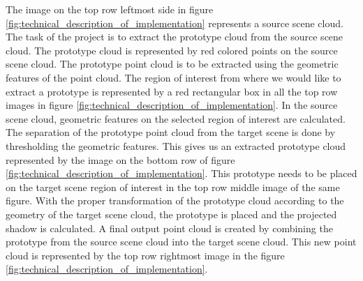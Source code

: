 The image on the top row leftmost side in figure \ref{fig:technical_description_of_implementation} represents a source scene cloud. The task of the project is to extract the prototype cloud from the source scene cloud. The prototype cloud is represented by red colored points on the source scene cloud. The prototype point cloud is to be extracted using the geometric features of the point cloud. The region of interest from where we would like to extract a prototype is represented by a red rectangular box in all the top row images in figure \ref{fig:technical_description_of_implementation}. In the source scene cloud, geometric features on the selected region of interest are calculated. The separation of the prototype point cloud from the target scene is done by thresholding the geometric features. This gives us an extracted prototype cloud represented by the image on the bottom row of figure \ref{fig:technical_description_of_implementation}. This prototype needs to be placed on the target scene region of interest in the top row middle image of the same figure. With the proper transformation of the prototype cloud according to the geometry of the target scene cloud, the prototype is placed and the projected shadow is calculated. A final output point cloud is created by combining the prototype from the source scene cloud into the target scene cloud. This new point cloud is represented by the top row rightmost image in the figure \ref{fig:technical_description_of_implementation}.
